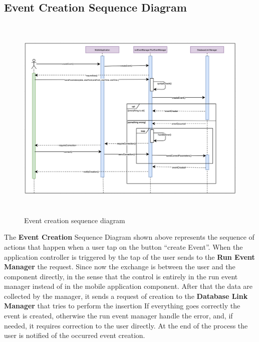 \documentclass[DD.tex]{subfiles}
\begin{document}
\subsection{Event Creation Sequence Diagram}
\begin{figure}[h!]
\centering
\includegraphics[height=10.00cm,keepaspectratio]{Figures/EventCreation}
\caption{Event creation sequence diagram}
\end{figure}

The \textbf{Event Creation} Sequence Diagram shown above represents the sequence of actions that happen when a user tap on the button “create Event”.
When the application controller is triggered by the tap of the user sends to the \textbf{Run Event Manager} the request.
Since now the exchange is between the user and the component directly, in the sense that the control is entirely in the run event manager instead of in the mobile application component.
After that the data are collected by the manager, it sends a request of creation to the \textbf{Database Link Manager }that tries to perform the insertion
If everything goes correctly the event is created, otherwise the run event manager handle the error, and, if needed, it requires correction to the user directly.
At the end of the process the user is notified of the occurred event creation.
\newpage
\end{document}
